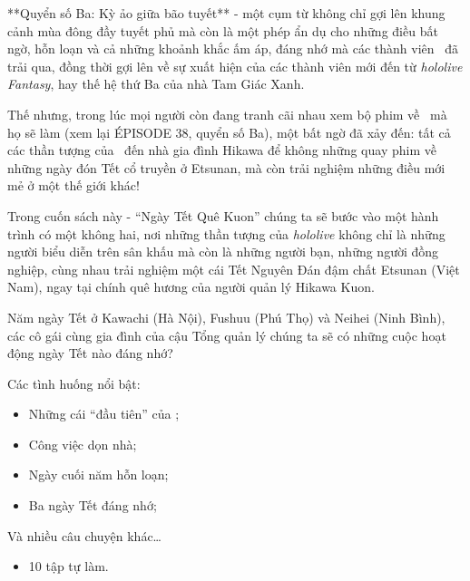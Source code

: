 \documentclass[main.tex]{subfiles}
\begin{document}
**Quyển số Ba: Kỳ ảo giữa bão tuyết** - một cụm từ không chỉ gợi lên khung cảnh mùa đông đầy tuyết phủ mà còn là một phép ẩn dụ cho những điều bất ngờ, hỗn loạn và cả những khoảnh khắc ấm áp, đáng nhớ mà các thành viên \hll\ đã trải qua, đồng thời gợi lên về sự xuất hiện của các thành viên mới đến từ \textit{hololive Fantasy}, hay thế hệ thứ Ba của nhà Tam Giác Xanh.

Thế nhưng, trong lúc mọi người còn đang tranh cãi nhau xem bộ phim về \hll\ mà họ sẽ làm (xem lại {\flaregothic ÉPISODE 38}, quyển số Ba), một bất ngờ đã xảy đến: tất cả các thần tượng của \hll\ đến nhà gia đình Hikawa để không những quay phim về những ngày đón Tết cổ truyền ở Etsunan, mà còn trải nghiệm những điều mới mẻ ở một thế giới khác!

Trong cuốn sách này - ``Ngày Tết Quê Kuon'' chúng ta sẽ bước vào một hành trình có một không hai, nơi những thần tượng của \textit{hololive} không chỉ là những người biểu diễn trên sân khấu mà còn là những người bạn, những người đồng nghiệp, cùng nhau trải nghiệm một cái Tết Nguyên Đán đậm chất Etsunan (Việt Nam), ngay tại chính quê hương của người quản lý Hikawa Kuon.

Năm ngày Tết ở Kawachi (Hà Nội), Fushuu (Phú Thọ) và Neihei (Ninh Bình), các cô gái cùng gia đình của cậu Tổng quản lý chúng ta sẽ có những cuộc hoạt động ngày Tết nào đáng nhớ?

Các tình huống nổi bật:
\begin{itemize}
    \item Những cái ``đầu tiên'' của \hll;
    \item Công việc dọn nhà;
    \item Ngày cuối năm hỗn loạn;
    \item Ba ngày Tết đáng nhớ;
\end{itemize}
Và nhiều câu chuyện khác\dots

{}
\begin{itemize}
\item 10 tập tự làm.
\end{itemize}
\end{document}

